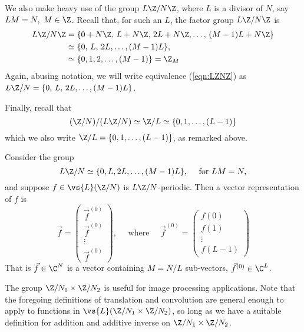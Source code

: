 We also make heavy use of the group $L\Z/N\Z$, where $L$ is a divisor of $N$,
say $LM=N, \; M \in \Z$.  
Recall that, for such an $L$, the factor group $L\Z/N\Z$ is
\begin{align}\label{eqn:LZNZ}
L\Z/N\Z &= \{0+N\Z,\,L+N\Z,\,2L+N\Z,\ldots,\,(M-1)L+N\Z\}\nonumber \\
        &\simeq \{0,\,L,\,2L,\ldots,(M-1)L\}, \\
        &\simeq \{0, 1, 2,\ldots,(M-1)\} = \Z_M \nonumber 
\end{align}
Again, abusing notation, we will write equivalence (\ref{eqn:LZNZ}) as 
$L\Z/N = \{0,\,L,\,2L,\ldots,(M-1)L\}$.

Finally, recall that
\begin{equation}\label{eqn:ZL}
(\Z/N)/(L\Z/N) \simeq  \Z/L \simeq \{0,1, \ldots, (L-1)\}
\end{equation}
which we also write $\Z/L = \{0,1, \ldots, (L-1)\}$, as remarked above.

\begin{example} \label{ex:factor-groups}
Consider the group
\[
L\Z/N \simeq \{0,L,2L,\ldots,(M-1)L\}, \quad \text{ for } LM = N,
\]
and suppose $f\in \vs{L}(\Z/N)$ is $L\Z/N$-periodic.
Then a vector representation of $f$ is
\[
\vec{f} = 
\begin{pmatrix}%
\vec{f}^{(0)}\\
\vec{f}^{(0)}\\
\vdots\\
\vec{f}^{(0)}
\end{pmatrix},%
 \quad \text{ where } \quad
\vec{f}^{(0)} =
\begin{pmatrix}%
f(0)\\
f(1)\\
\vdots\\
f(L-1)
\end{pmatrix}%
\]
That is $\vec{f}\in \C^N$ is a vector containing $M = N/L$ sub-vectors,
$\vec{f}^{(0)}\in \C^L$.
\end{example}

\begin{remark}
The group $\Z/N_1 \times \Z/N_2$ is useful for image processing
applications.  Note that the foregoing definitions of translation and
convolution are general enough to apply to functions in 
$\vs{L}(\Z/N_1 \times \Z/N_2)$, so long as we have a suitable definition for
addition and additive inverse on $\Z/N_1 \times \Z/N_2$.  
\end{remark}

